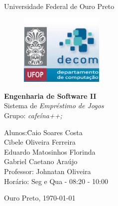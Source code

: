 \documentclass[a4paper, 12pt]{article}
\begin{document}

\begin{titlepage}
	\begin{center}
		\huge{Universidade Federal de Ouro Preto}

\vspace{10pt}
\begin{figure}[H]
\centering
\includegraphics[width=4cm]{img/logo.jpg}
\end{figure}
        
        \vspace{85pt}
        
		\textbf{\LARGE{Engenharia de Software II}}\\
		\large{Sistema de \textit{Empréstimo de Jogos}\\ Grupo: \textit{cafeína++;}}
		\vspace{160pt}
		
	\end{center}
	
	\begin{flushleft}
		\begin{tabbing}
			Alunos:\qquad\qquad\= Caio Soares Costa \\
			\>Cibele Oliveira Ferreira \\
            \>Eduardo Matosinhos Florinda \\
            \>Gabriel Caetano Araújo \\
			Professor:\> Johnatan Oliveira \\
			Horário:\> Seg e Qua - 08:20 - 10:00\\
		
	\end{tabbing}
		  
	\end{flushleft}
	
	\begin{center}
		Ouro Preto, \today
	\end{center}
\end{titlepage}
\newpage
\tableofcontents
\thispagestyle{empty}
\end{document}
